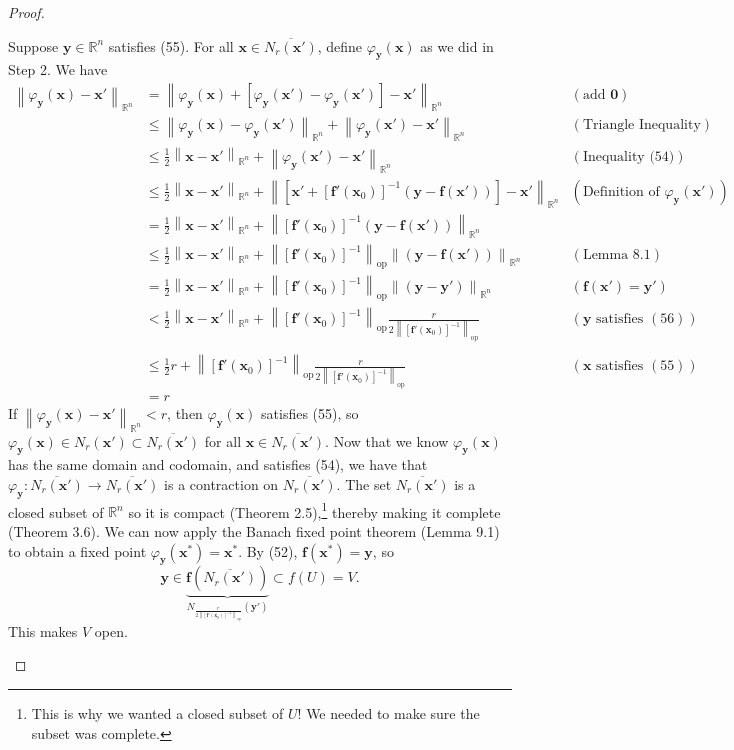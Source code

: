 \documentclass{article}
\newcommand{\R}{\mathbb{R}}
\newcommand{\x}{\mathbf{x}}
\newcommand{\f}{\mathbf{f}}
\newcommand{\y}{\mathbf{y}}
\newcommand{\ze}{\mathbf{0}}
\newcommand{\norm}[1]{\left\lVert#1\right\rVert}
\newcommand{\normop}[1]{\left\lVert#1\right\rVert_\text{op}}
\theoremstyle{definition}
\begin{document}
\begin{proof}
\begin{enumerate}
			
			Suppose $ \y\in \R^n $ satisfies (55). For all $ \x\in\overline{N_r(\x')}  $, define $ \varphi_{\y}(\x) $ as we did in Step 2. We have 
			\begin{align*}
				\norm{\varphi_{\y}(\x) - \x'}_{\R^n}& =	\norm{\varphi_{\y}(\x) + \left[\varphi_{\y}(\x') -\varphi_{\y}(\x') \right]  - \x'}_{\R^n} & (\text{add }\ze)\\ 
				& \le \norm{\varphi_{\y}(\x) - \varphi_{\y}(\x')}_{\R^n}  + \norm{\varphi_{\y}(\x')  - \x'}_{\R^n} & (\text{Triangle Inequality})\\ & 
				\le \frac{1}{2}\norm{\x-\x'}_{\R^n} + \norm{\varphi_\y(\x')  - \x'}_{\R^n} & (\text{Inequality (54)})\\
				& 
				\le \frac{1}{2}\norm{\x-\x'}_{\R^n} + \norm{\left[\x' + [\f'(\x_0)]^{-1}(\y - \f(\x'))\right] - \x'}_{\R^n} & (\text{Definition of }\varphi_{\y}(\x')) \\ & = 	 \frac{1}{2}\norm{\x-\x'}_{\R^n} + \norm{ [\f'(\x_0)]^{-1}(\y - \f(\x'))}_{\R^n} \\ &\le  \frac{1}{2}\norm{\x-\x'}_{\R^n} + \normop{[\f'(\x_0)]^{-1}}\norm{(\y - \f(\x'))}_{\R^n} & (\text{Lemma 8.1}) \\
				&=  \frac{1}{2}\norm{\x-\x'}_{\R^n} + \normop{[\f'(\x_0)]^{-1}}\norm{(\y - \y')}_{\R^n} & (\f(\x')=\y') \\
				& < \frac{1}{2}\norm{\x-\x'}_{\R^n} + \normop{[\f'(\x_0)]^{-1}}\frac{r}{2\normop{[\f'(\x_0)]^{-1}}} & (\y\text{ satisfies }(56))\\ \\
				& \le \frac{1}{2}r+ \normop{[\f'(\x_0)]^{-1}}\frac{r}{2\normop{[\f'(\x_0)]^{-1}}} & (\x\text{ satisfies }(55))\\ & = r
			\end{align*}
			If $ \norm{\varphi_{\y}(\x) - \x'}_{\R^n} <r$, then $ \varphi_{\y}(\x)  $ satisfies (55), so $ \varphi_{\y}(\x)\in N_r(\x') \subset \overline{N_r(\x')}   $ for all $ \x\in\overline{N_r(\x')} $. Now that we know $ \varphi_\y(\x) $ has the same domain and codomain, and satisfies (54), we have that $ \varphi_{\y}:\overline{N_r(\x')} \to \overline{N_r(\x')}  $ is a contraction on $ \overline{N_r(\x')}  $. The set $ \overline{N_r(\x')} $ is a closed subset of $ \R^n $ so it is compact (Theorem 2.5),\footnote{This is why we wanted a closed subset of $U$! We needed to make sure the subset was complete.} thereby making it complete (Theorem 3.6). We can now apply the Banach fixed point theorem (Lemma 9.1) to obtain a fixed point $ \varphi_\y(\x^*)=\x^* $. By (52), $ \f(\x^*)=\y $, so $$ \y\in \underbrace{\f\left(\overline{N_r(\x')}\right) }_{N_{\frac{r}{2\normop{[\f'(\x_0)]^{-1}}}}(\y')}\subset f(U)=V .$$ This makes $ V $ open.

\end{enumerate}
\end{proof}
\end{document}
